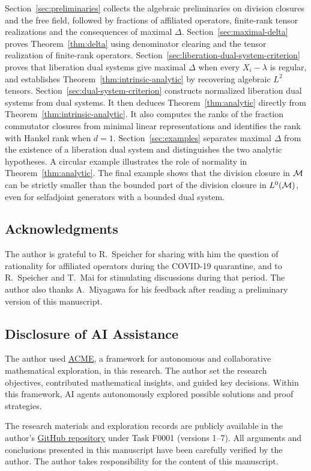 Section~\ref{sec:preliminaries} collects the algebraic preliminaries on division closures and the free field, followed by fractions of affiliated operators, finite-rank tensor realizations and the consequences of maximal $\Delta$.
Section~\ref{sec:maximal-delta} proves Theorem~\ref{thm:delta} using denominator clearing and the tensor realization of finite-rank operators.
Section~\ref{sec:liberation-dual-system-criterion} proves that liberation dual systems give maximal $\Delta$ when every $X_i-\lambda$ is regular, and establishes Theorem~\ref{thm:intrinsic-analytic} by recovering algebraic $L^2$ tensors.
Section~\ref{sec:dual-system-criterion} constructs normalized liberation dual systems from dual systems.
It then deduces Theorem~\ref{thm:analytic} directly from Theorem~\ref{thm:intrinsic-analytic}.
It also computes the ranks of the fraction commutator closures from minimal linear representations and identifies the rank with Hankel rank when $d=1$.
Section~\ref{sec:examples} separates maximal $\Delta$ from the existence of a liberation dual system and distinguishes the two analytic hypotheses.
A circular example illustrates the role of normality in Theorem~\ref{thm:analytic}.
The final example shows that the division closure in $\mathcal M$ can be strictly smaller than the bounded part of the division closure in $L^0(\mathcal M)$, even for selfadjoint generators with a bounded dual system.

\subsection*{Acknowledgments}
The author is grateful to R.~Speicher for sharing with him the question of rationality for affiliated operators during the COVID-19 quarantine, and to R.~Speicher and T.~Mai for stimulating discussions during that period.
The author also thanks A.~Miyagawa for his feedback after reading a preliminary version of this manuscript.

\subsection*{Disclosure of AI Assistance}
The author used \href{https://github.com/vtejdn/acme}{ACME}, a framework for autonomous and collaborative mathematical exploration, in this research.
The author set the research objectives, contributed mathematical insights, and guided key decisions.
Within this framework, AI agents autonomously explored possible solutions and proof strategies.

The research materials and exploration records are publicly available in the author's \href{https://github.com/vtejdn/yin-math-research}{GitHub repository} under Task F0001 (versions 1--7).
All arguments and conclusions presented in this manuscript have been carefully verified by the author.
The author takes responsibility for the content of this manuscript.
